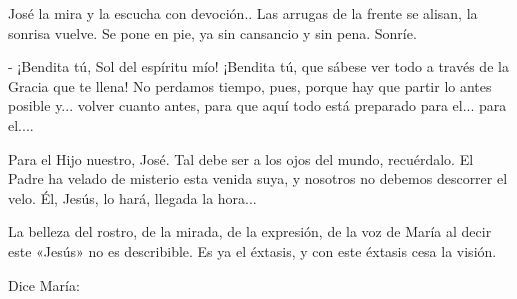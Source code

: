 \documentclass[12pt, twoside, openright]{book} %
\begin{document}
José la mira y la escucha con devoción.. Las arrugas de la frente se alisan, la sonrisa vuelve. Se pone en pie, ya sin cansancio y sin pena. Sonríe. 

- ¡Bendita tú, Sol del espíritu mío! ¡Bendita tú, que sábese ver todo a través de la Gracia que te llena! No perdamos tiempo, pues, porque hay que partir lo antes posible y... volver cuanto antes, para que aquí todo está preparado para el... para el.... 

Para el Hijo nuestro, José. Tal debe ser a los ojos del mundo, recuérdalo. El Padre ha velado de misterio esta venida suya, y nosotros no debemos descorrer el velo. Él, Jesús, lo hará, llegada la hora... 

La belleza del rostro, de la mirada, de la expresión, de la voz de María al decir este «Jesús» no es describible. Es ya el éxtasis, y con este éxtasis cesa la visión. 

Dice María: 
\end{document}
